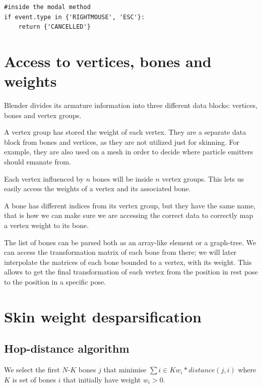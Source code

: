 \documentclass[12pt,twoside]{report}
\begin{document}
\begin{lstlisting}
#inside the modal method
if event.type in {'RIGHTMOUSE', 'ESC'}:
    return {'CANCELLED'}
\end{lstlisting}

\section{Access to vertices, bones and weights}
Blender divides its armature information into three different data blocks: vertices, bones and vertex groups.

A vertex group has stored the weight of each vertex. They are a separate data block from bones and vertices, as they are not utilized just for skinning. For example, they are also used on a mesh in order to decide where particle emitters should emanate from.

Each vertex influenced by $n$ bones will be inside $n$ vertex groups. This lets us easily access the weights of a vertex and its associated bone.

A bone has different indices from its vertex group, but they have the same name, that is how we can make sure we are accessing the correct data to correctly map a vertex weight to its bone.

The list of bones can be parsed both as an array-like element or a graph-tree. We can access the transformation matrix of each bone from there; we will later interpolate the matrices of each bone bounded to a vertex, with its weight. This allows to get the final transformation of each vertex from the position in rest pose to the position in a specific pose.

\section{Skin weight desparsification}
\label{sec:desparsificationImplem}

\subsection{Hop-distance algorithm}
\label{sec:hop-distance}
We select the first $N$-$K$ bones $j$ that minimise $\sum{i\in K} w_i * distance(j,i)$ where $K$ is set of bones $i$ that initially have weight $w_i > 0$.
\end{document}
